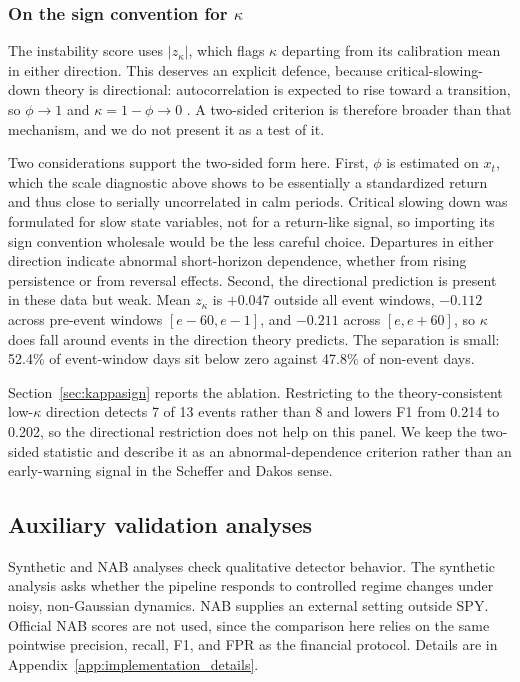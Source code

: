 \documentclass[pdflatex,sn-mathphys-num,iicol]{sn-jnl}
\begin{document}
\subsubsection*{On the sign convention for $\kappa$}
The instability score uses $|z_\kappa|$, which flags $\kappa$ departing from its calibration mean in either direction. This deserves an explicit defence, because critical-slowing-down theory is directional: autocorrelation is expected to rise toward a transition, so $\phi\to1$ and $\kappa=1-\phi\to0$ \cite{scheffer2009,dakos2012}. A two-sided criterion is therefore broader than that mechanism, and we do not present it as a test of it.

Two considerations support the two-sided form here. First, $\phi$ is estimated on $x_t$, which the scale diagnostic above shows to be essentially a standardized return and thus close to serially uncorrelated in calm periods. Critical slowing down was formulated for slow state variables, not for a return-like signal, so importing its sign convention wholesale would be the less careful choice. Departures in either direction indicate abnormal short-horizon dependence, whether from rising persistence or from reversal effects. Second, the directional prediction is present in these data but weak. Mean $z_\kappa$ is $+0.047$ outside all event windows, $-0.112$ across pre-event windows $[e-60,e-1]$, and $-0.211$ across $[e,e+60]$, so $\kappa$ does fall around events in the direction theory predicts. The separation is small: 52.4\% of event-window days sit below zero against 47.8\% of non-event days.

Section~\ref{sec:kappasign} reports the ablation. Restricting to the theory-consistent low-$\kappa$ direction detects 7 of 13 events rather than 8 and lowers F1 from 0.214 to 0.202, so the directional restriction does not help on this panel. We keep the two-sided statistic and describe it as an abnormal-dependence criterion rather than an early-warning signal in the Scheffer and Dakos sense.

\subsection{Auxiliary validation analyses}
Synthetic and NAB analyses check qualitative detector behavior. The synthetic analysis asks whether the pipeline responds to controlled regime changes under noisy, non-Gaussian dynamics. NAB supplies an external setting outside SPY. Official NAB scores are not used, since the comparison here relies on the same pointwise precision, recall, F1, and FPR as the financial protocol. Details are in Appendix~\ref{app:implementation_details}.
\end{document}
